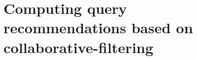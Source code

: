 \section{Computing query recommendations based on collaborative-filtering}
\label{collaborative-query-rec}






